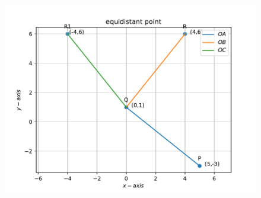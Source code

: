 \documentclass[12pt]{article}
\begin{document}
\begin{enumerate}
\begin{figure}[!h]
 \begin{center}
  \includegraphics[width=\columnwidth]{./figs/fig.pdf}
 \end{center}
\caption{}
\label{fig:Fig1}
\end{figure}



\end{enumerate}
\end{document}
